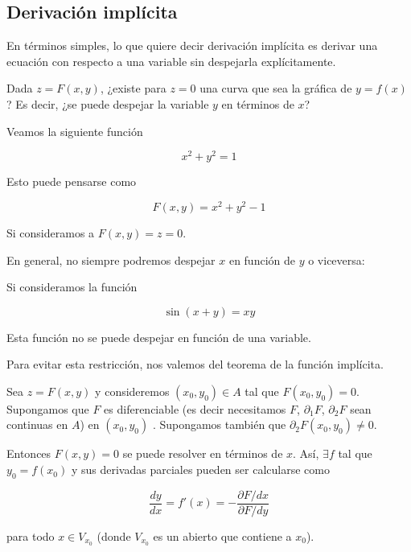 \subsection{Derivación implícita}

En términos simples, lo que quiere decir derivación implícita es derivar una ecuación con respecto a una variable sin despejarla explícitamente.

\begin{pre}
    Dada $z = F(x,y)$, ¿existe para $z = 0$ una curva que sea la gráfica de $y = f(x)$? Es decir, ¿se puede despejar la variable $y$ en términos de $x$?
\end{pre}

\begin{ejem}
    Veamos la siguiente función
    
    \[
    x^2 + y^2 = 1
    \]
    
    Esto puede pensarse como
    
    \[
    F(x,y) = x^2 + y^2 - 1
    \]
    
    Si consideramos a $F(x,y) = z = 0$.
\end{ejem}

En general, no siempre podremos despejar $x$ en función de $y$ o viceversa:

\begin{ejem}
    Si consideramos la función
    
    \[
    \sin(x+y) = xy
    \]
    
    Esta función no se puede despejar en función de una variable.
\end{ejem}

Para evitar esta restricción, nos valemos del teorema de la función implícita.

\begin{teo}
    Sea $z = F(x,y)$ y consideremos $(x_0, y_0) \in A$ tal que $F(x_0, y_0) = 0$. Supongamos que $F$ es diferenciable (es decir necesitamos $F$, $\partial_1 F$, $\partial_2 F$ sean continuas en $A$) en $(x_0, y_0)$ . Supongamos también que $\partial_2 F(x_0, y_0) \neq 0$.
    
    Entonces $F(x, y) = 0$ se puede resolver en términos de $x$. Así, $\exists f$ tal que $y_0 = f(x_0)$ y sus derivadas parciales pueden ser calcularse como
    
    \[
    \frac{dy}{dx} = f'(x) = - \frac{\partial F/dx}{\partial F/dy}
    \]
    
    \noindent para todo $x \in V_{x_0}$ (donde $V_{x_0}$ es un abierto que contiene a $x_0$).
\end{teo}

